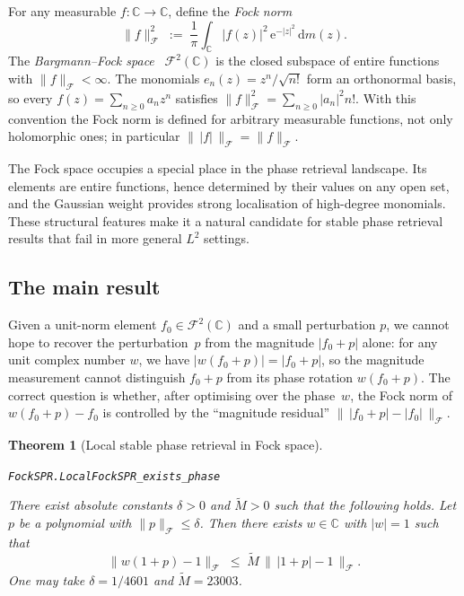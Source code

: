 \documentclass[11pt]{amsart}
\newtheorem{theorem}{Theorem}[section]
\theoremstyle{definition}
\theoremstyle{remark}
\begin{document}
For any measurable $f \colon \mathbb{C} \to \mathbb{C}$, define the
\emph{Fock norm}
\[
\lVert f \rVert_{\mathcal{F}}^2
\;:=\;
\frac{1}{\pi}\int_{\mathbb{C}} \lvert f(z) \rvert^2 \, \mathrm{e}^{-\lvert z \rvert^2}\,\mathrm{d} m(z).
\]
The \emph{Bargmann--Fock space}~\cite{bargmann1961hilbert}
$\mathcal{F}^2(\mathbb{C})$ is the closed subspace of entire functions with
$\lVert f \rVert_\mathcal{F} < \infty$.
The monomials $e_n(z) = z^n/\sqrt{n!}$ form an orthonormal basis, so every
$f(z) = \sum_{n \ge 0} a_n z^n$ satisfies
$\lVert f \rVert_{\mathcal{F}}^2 = \sum_{n \ge 0} \lvert a_n \rvert^2 n!$.
With this convention the Fock norm is defined for arbitrary measurable
functions, not only holomorphic ones; in particular
$\lVert \,\lvert f \rvert\, \rVert_\mathcal{F} = \lVert f \rVert_\mathcal{F}$.

The Fock space occupies a special place in the phase retrieval landscape.  Its
elements are entire functions, hence determined by their values on any open
set, and the Gaussian weight provides strong localisation of
high-degree monomials.  These structural features make it a natural candidate
for stable phase retrieval results that fail in more general $L^2$ settings.

\subsection{The main result}

Given a unit-norm element $f_0 \in \mathcal{F}^2(\mathbb{C})$ and a small perturbation $p$,
we cannot hope to recover the perturbation~$p$ from the magnitude
$\lvert f_0 + p \rvert$ alone: for any unit complex number $w$, we have
$\lvert w(f_0 + p) \rvert = \lvert f_0 + p \rvert$, so the magnitude measurement cannot
distinguish $f_0 + p$ from its phase rotation $w(f_0 + p)$.  The correct
question is whether, after optimising over the phase~$w$, the Fock norm of
$w(f_0+p) - f_0$ is controlled by the ``magnitude residual''
$\bigl\|\, \lvert f_0 + p \rvert - \lvert f_0 \rvert\,\bigr\|_\mathcal{F}$.

\begin{theorem}[Local stable phase retrieval in Fock space]\label{thm:local}
\par\noindent\texttt{FockSPR.LocalFockSPR\_exists\_phase}\par\smallskip
There exist absolute constants $\delta > 0$ and $\widetilde{M} > 0$ such
that the following holds.  Let $p$ be a polynomial with
$\lVert p \rVert_\mathcal{F} \le \delta$.  Then there exists $w \in \mathbb{C}$ with $\lvert w \rvert = 1$
such that
\[
\lVert w(1+p) - 1 \rVert_\mathcal{F}
\;\le\;
\widetilde{M}\,
\bigl\|\, \lvert 1+p \rvert - 1 \,\bigr\|_{\mathcal{F}}.
\]
One may take $\delta = 1/4601$ and $\widetilde{M} = 23003$.
\end{theorem}
\end{document}
